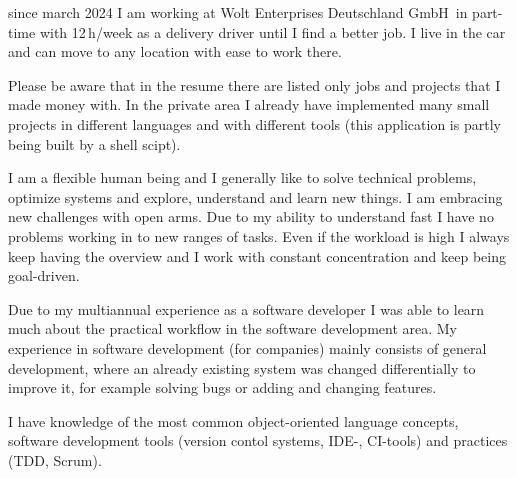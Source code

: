 \documentclass[fromphone,parskip=half]{scrlttr2}%
\newcommand\versionLanguageStart{}
\newcommand\versionLanguageEnd{}
\begin{document}
	\begin{letter}%
	{
		\addressReceiver
	}
		\opening{\joinList{\dear}{\genderReceiver}{\surnameReceiver}{,}}
\versionLanguageStart%
		since march 2024 I am working at \glqq Wolt Enterprises Deutschland GmbH\grqq\ in part-time with 12\,h/week as a delivery driver until I find a better job.
		I live in the car and can move to any location with ease to work there.
\versionLanguageEnd
		
		
\versionLanguageStart%
		Please be aware that in the resume there are listed only jobs and projects that I made money with.
		In the private area I already have implemented many small projects in different languages and with different tools (this application is partly being built by a shell scipt).
\versionLanguageEnd

\versionLanguageStart%
		I am a flexible human being and I generally like to solve technical problems, optimize systems and explore, understand and learn new things.
		I am embracing new challenges with open arms.
		Due to my ability to understand fast I have no problems working in to new ranges of tasks.
		Even if the workload is high I always keep having the overview and I work with constant concentration and keep being goal-driven.
\versionLanguageEnd
		
\versionLanguageStart%
		Due to my multiannual experience as a software developer I was able to learn much about the practical workflow in the software development area.
		My experience in software development (for companies) mainly consists of general development, where an already existing system was changed differentially to improve it, for example solving bugs or adding and changing features.
\versionLanguageEnd

\versionLanguageStart%
		I have knowledge of the most common object-oriented language concepts, software development tools (version contol systems, IDE-, CI-tools) and practices (TDD, Scrum).
\versionLanguageEnd

%
%		
		

\end{letter}
\end{document}
